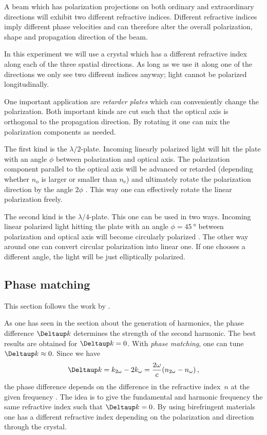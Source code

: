 \documentclass[11pt, english, fleqn, DIV=15, headinclude, BCOR=2cm]{scrreprt}
\begin{document}
A beam which has polarization projections on both ordinary and extraordinary
directions will exhibit two different refractive indices. Different refractive
indices imply different phase velocities and can therefore alter the overall
polarization, shape and propagation direction of the beam.

In this experiment we will use a crystal which has a different refractive index
along each of the three spatial directions. As long as we use it along one of
the directions we only see two different indices anyway; light cannot be
polarized longitudinally.

One important application are \emph{retarder plates} which can conveniently
change the polarization. Both important kinds are cut such that the optical
axis is orthogonal to the propagation direction. By rotating it one can mix the
polarization components as needed.

The first kind is the $\lambda/2$-plate. Incoming linearly polarized light will
hit the plate with an angle $\phi$ between polarization and optical axis. The
polarization component parallel to the optical axis will be advanced or
retarded (depending whether $n_\mathrm o$ is larger or smaller than $n_\mathrm
e$) and ultimately rotate the polarization direction by the angle $2 \phi$
\parencite[Figure~3.20]{meschede/optik_licht_laser/2008}. This way one can
effectively rotate the linear polarization freely.

The second kind is the $\lambda/4$-plate. This one can be used in two ways.
Incoming linear polarized light hitting the plate with an angle $\phi =
\SI{45}{\degree}$ between polarization and optical axis will become circularly
polarized \parencite[Figure~3.20]{meschede/optik_licht_laser/2008}. The other
way around one can convert circular polarization into linear one. If one
chooses a different angle, the light will be just elliptically polarized.

\subsection{Phase matching}

This section follows the work by
\textcite[Section~12.4.3]{meschede/optik_licht_laser/2008}.

As one has seen in the section about the generation of harmonics, the phase
difference $\Deltaup k$ determines the strength of the second harmonic. The
best results are obtained for $\Deltaup k = 0$. With \emph{phase matching}, one
can tune $\Deltaup k \approx 0$. Since we have
\[
    \Deltaup k
    = k_{2\omega} - 2 k_\omega
    = \frac{2\omega}{c} (n_{2\omega} - n_\omega) \,,
\]
the phase difference depends on the difference in the refractive index~$n$ at
the given frequency
\parencite[Equation~(12.12)]{meschede/optik_licht_laser/2008}. The idea is to
give the fundamental and harmonic frequency the same refractive index such that
$\Deltaup k = 0$. By using birefringent materials one has a different
refractive index depending on the polarization and direction through the
crystal.
\end{document}
